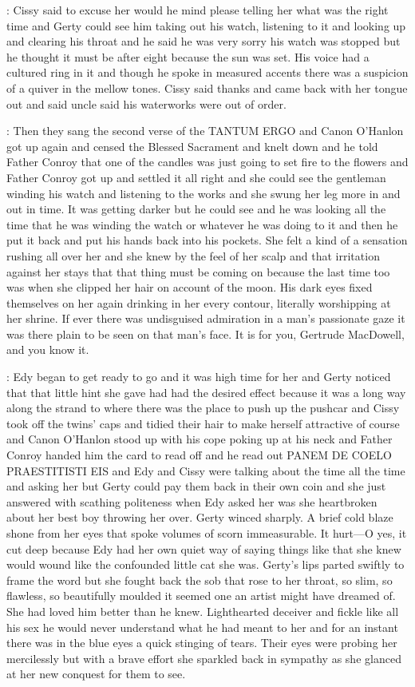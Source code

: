 :
Cissy said to excuse her would he mind please telling her what was the
right time and Gerty could see him taking out his watch, listening to it
and looking up and clearing his throat and he said he was very sorry his
watch was stopped but he thought it must be after eight because the sun
was set. His voice had a cultured ring in it and though he spoke in
measured accents there was a suspicion of a quiver in the mellow tones.
Cissy said thanks and came back with her tongue out and said uncle said
his waterworks were out of order.

:
Then they sang the second verse of the TANTUM ERGO and Canon
O'Hanlon got up again and censed the Blessed Sacrament and knelt down and
he told Father Conroy that one of the candles was just going to set fire
to the flowers and Father Conroy got up and settled it all right and she
could see the gentleman winding his watch and listening to the works and
she swung her leg more in and out in time. It was getting darker but he
could see and he was looking all the time that he was winding the watch or
whatever he was doing to it and then he put it back and put his hands back
into his pockets. She felt a kind of a sensation rushing all over her and
she knew by the feel of her scalp and that irritation against her stays
that that thing must be coming on because the last time too was when she
clipped her hair on account of the moon. His dark eyes fixed themselves
on her again drinking in her every contour, literally worshipping at her
shrine. If ever there was undisguised admiration in a man's passionate
gaze it was there plain to be seen on that man's face. It is for you,
Gertrude MacDowell, and you know it.

:
Edy began to get ready to go and it was high time for her and Gerty
noticed that that little hint she gave had had the desired effect because
it was a long way along the strand to where there was the place to push up
the pushcar and Cissy took off the twins' caps and tidied their hair to
make herself attractive of course and Canon O'Hanlon stood up with his
cope poking up at his neck and Father Conroy handed him the card to read
off and he read out PANEM DE COELO PRAESTITISTI EIS and Edy and Cissy were
talking about the time all the time and asking her but Gerty could pay
them back in their own coin and she just answered with scathing politeness
when Edy asked her was she heartbroken about her best boy throwing her
over. Gerty winced sharply. A brief cold blaze shone from her eyes that
spoke volumes of scorn immeasurable. It hurt—O yes, it cut deep because
Edy had her own quiet way of saying things like that she knew would wound
like the confounded little cat she was. Gerty's lips parted swiftly to
frame the word but she fought back the sob that rose to her throat,
so slim, so flawless, so beautifully moulded it seemed one an artist
might have dreamed of. She had loved him better than he knew.
Lighthearted deceiver and fickle like all his sex he would never
understand what he had meant to her and for an instant there was
in the blue eyes a quick stinging of tears. Their eyes were
probing her mercilessly but with a brave effort she sparkled back in
sympathy as she glanced at her new conquest for them to see.

